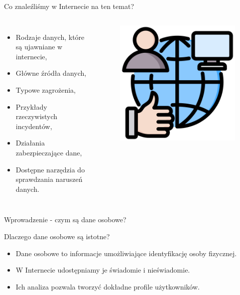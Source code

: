 \begin{frame}{Co znaleźliśmy w Internecie na ten temat?}
  \begin{columns}[c]
    \begin{itemize}
      \item Rodzaje danych, które są ujawniane w internecie,
      \item Główne źródła danych,
      \item Typowe zagrożenia,
      \item Przykłady rzeczywistych incydentów,
      \item Działania zabezpieczające dane,
      \item Dostępne narzędzia do sprawdzania naruszeń danych.
    \end{itemize}
    \begin{figure}
      \centering
      \includegraphics[height=0.45\textheight]{images/social-network.png}
    \end{figure}
\end{columns}
\end{frame}

\begin{frame}{Wprowadzenie - czym są dane osobowe?}
    \begin{alertblock}{Dlaczego dane osobowe są istotne?}
      \begin{itemize}
        \item Dane osobowe to informacje umożliwiające identyfikację osoby fizycznej. \cite{PII_USDE}
        \item W Internecie udostępniamy je świadomie i nieświadomie.
        \item Ich analiza pozwala tworzyć dokładne profile użytkowników.
      \end{itemize}
    \end{alertblock}
  \end{frame}
  
